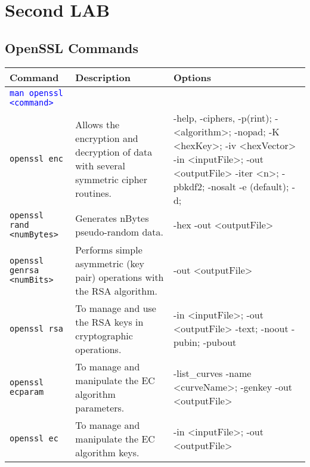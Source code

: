 \section{Second LAB}
\cite{LAB2}
\subsection{OpenSSL Commands}

\begin{table}[]
	\centering
    \begin{tabular}{|p{6cm}|p{3cm}|p{7cm}|}\hline
        \rowcolor{gray!30}
		\textbf{Command} & \textbf{Description} & \textbf{Options} \\ \hline
		\textcolor{Blue}{\texttt{man openssl <command>}} 
			& 
			& 
			\\ \hline
        \texttt{openssl enc} 
			& Allows the encryption and decryption of data with several symmetric cipher
        routines. 
			& -help, -ciphers, -p(rint);
				\newline -<algorithm>; -nopad;
				\newline -K <hexKey>; -iv <hexVector>
				\newline -in <inputFile>; -out <outputFile>
				\newline -iter <n>; -pbkdf2; -nosalt
				\newline -e (default); -d; 
				\\ \hline
        \texttt{openssl rand <numBytes>} 
			& Generates nBytes pseudo-random data.
			& -hex
				\newline -out <outputFile>
			\\ \hline
        \texttt{openssl genrsa <numBits>} 
			& Performs simple asymmetric (key pair) operations with the RSA algorithm.
			& -out <outputFile>
			\\ \hline
		\texttt{openssl rsa} 
			& To manage and use the RSA keys in cryptographic operations.
			& -in <inputFile>; -out <outputFile>
				\newline -text; -noout
				\newline -pubin; -pubout
			\\ \hline
		\texttt{openssl ecparam} 
			& To manage and manipulate the EC algorithm parameters.
			& -list\_curves
				\newline -name <curveName>; -genkey
				\newline -out <outputFile>
			\\ \hline
		\texttt{openssl ec} 
			& To manage and manipulate the EC algorithm keys.
			& -in <inputFile>; -out <outputFile>

\end{tabular}
\end{table}
